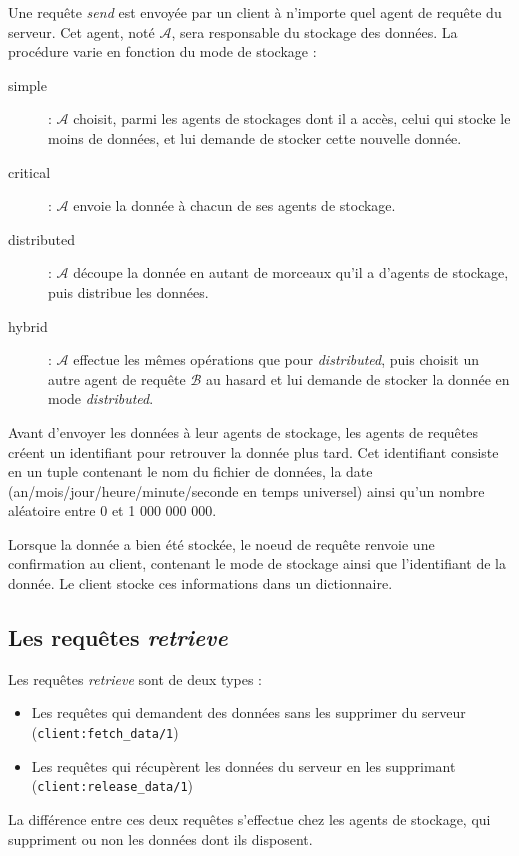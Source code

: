 \documentclass[a4paper]{article}
\begin{document}
Une requête \emph{send} est envoyée par un client à n'importe quel agent de requête du serveur.
Cet agent, noté $\mathcal{A}$, sera responsable du stockage des données. La procédure varie en fonction du mode de stockage :
\begin{description}
    \item[simple] : $\mathcal{A}$ choisit, parmi les agents de stockages dont il a accès, celui qui stocke le moins de données, et lui demande de stocker cette nouvelle donnée.
    \item[critical] : $\mathcal{A}$ envoie la donnée à chacun de ses agents de stockage.
    \item[distributed] : $\mathcal{A}$ découpe la donnée en autant de morceaux qu'il a d'agents de stockage, puis distribue les données.
    \item[hybrid] : $\mathcal{A}$ effectue les mêmes opérations que pour \emph{distributed}, puis choisit un autre agent de requête $\mathcal{B}$
    au hasard et lui demande de stocker la donnée en mode \emph{distributed}.
\end{description}

Avant d'envoyer les données à leur agents de stockage, les agents de requêtes créent un identifiant pour retrouver la donnée plus tard. Cet identifiant consiste en un tuple contenant
le nom du fichier de données, la date (an/mois/jour/heure/minute/seconde en temps universel) ainsi qu'un nombre aléatoire entre 0 et 1 000 000 000.

Lorsque la donnée a bien été stockée, le noeud de requête renvoie une confirmation au client, contenant le mode de stockage ainsi que l'identifiant de la donnée.
Le client stocke ces informations dans un dictionnaire.

\subsection{Les requêtes \emph{retrieve}}
\label{ssec:retrieve}
Les requêtes \emph{retrieve} sont de deux types :
\begin{itemize}
    \item Les requêtes qui demandent des données sans les supprimer du serveur (\texttt{client:fetch\_data/1})
    \item Les requêtes qui récupèrent les données du serveur en les supprimant (\texttt{client:release\_data/1})
\end{itemize}
La différence entre ces deux requêtes s'effectue chez les agents de stockage, qui suppriment ou non les données
dont ils disposent.
\end{document}
